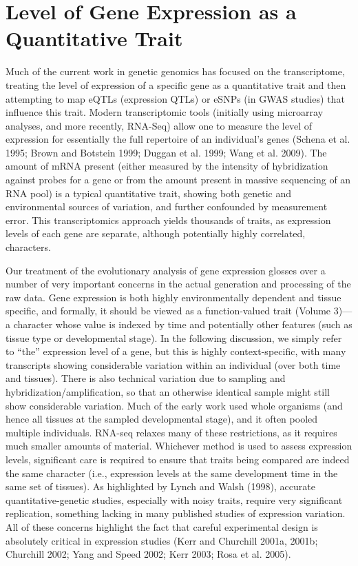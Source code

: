 \documentclass{article}
\begin{document}
\section{Level of Gene Expression as a Quantitative Trait}
Much of the current work in genetic genomics has focused on the transcriptome, treating the level of expression of a specific gene as a quantitative trait and then attempting to map eQTLs (expression QTLs) or eSNPs (in GWAS studies) that influence this trait. Modern transcriptomic tools (initially using microarray analyses, and more recently, RNA-Seq) allow one to measure the level of expression for essentially the full repertoire of an individual's genes (Schena et al. 1995; Brown and Botstein 1999; Duggan et al. 1999; Wang et al. 2009). The amount of mRNA present (either measured by the intensity of hybridization against probes for a gene or from the amount present in massive sequencing of an RNA pool) is a typical quantitative trait, showing both genetic and environmental sources of variation, and further confounded by measurement error. This transcriptomics approach yields thousands of traits, as expression levels of each gene are separate, although potentially highly correlated, characters.

Our treatment of the evolutionary analysis of gene expression glosses over a number of very important concerns in the actual generation and processing of the raw data. Gene expression is both highly environmentally dependent and tissue specific, and formally, it should be viewed as a function-valued trait (Volume 3)—a character whose value is indexed by time and potentially other features (such as tissue type or developmental stage). In the following discussion, we simply refer to “the” expression level of a gene, but this is highly context-specific, with many transcripts showing considerable variation within an individual (over both time and tissues). There is also technical variation due to sampling and hybridization/amplification, so that an otherwise identical sample might still show considerable variation. Much of the early work used whole organisms (and hence all tissues at the sampled developmental stage), and it often pooled multiple individuals. RNA-seq relaxes many of these restrictions, as it requires much smaller amounts of material. Whichever method is used to assess expression levels, significant care is required to ensure that traits being compared are indeed the same character (i.e., expression levels at the same development time in the same set of tissues). As highlighted by Lynch and Walsh (1998), accurate quantitative-genetic studies, especially with noisy traits, require very significant replication, something lacking in many published studies of expression variation. All of these concerns highlight the fact that careful experimental design is absolutely critical in expression studies (Kerr and Churchill 2001a, 2001b; Churchill 2002; Yang and Speed 2002; Kerr 2003; Rosa et al. 2005).
\end{document}
